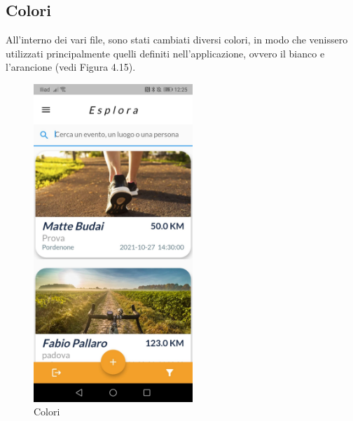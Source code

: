 \subsection{Colori}
All'interno dei vari file, sono stati cambiati diversi colori, in modo che venissero utilizzati principalmente quelli definiti nell'applicazione, ovvero il bianco e l'arancione (vedi Figura 4.15).\\

\begin{figure}[htbp]	
	\centering
	\includegraphics[width=6cm]{immagini/colori.jpeg}
	\caption{Colori}
	\label{fig:Colori}
\end{figure}

\newpage

